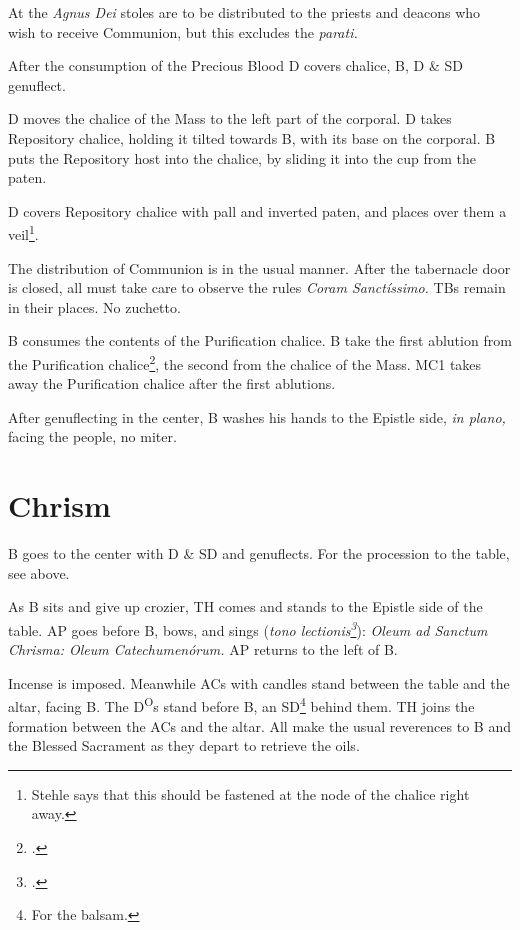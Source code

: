 \documentclass{report}
\begin{document}
\begin{multicols}{2}
    \rubric At the \textit{Agnus Dei} stoles are to be distributed to the
    priests and deacons who wish to receive Communion, but this excludes the
    \textit{parati.}

    \rubric After the consumption of the Precious Blood D covers chalice, B, D
    \& SD genuflect. 

    \rubric D moves the chalice of the Mass to the left part of the corporal. D
    takes Repository chalice, holding it tilted towards B, with its base on the
    corporal. B puts the Repository host into the chalice, by sliding it into
    the cup from the paten.

    \rubric D covers Repository chalice with pall and inverted paten, and
    places over them a veil\footnote{Stehle says that this should be fastened
    at the node of the chalice right away.}.

    \rubric The distribution of Communion is in the usual manner. After the
    tabernacle door is closed, all must take care to observe the rules
    \textit{Coram Sanctíssimo.} TBs remain in their places. No zuchetto.

    \rubric B consumes the contents of the Purification chalice. B take the
    first ablution from the Purification chalice\footcite[186]{stehle}, the
    second from the chalice of the Mass. MC1 takes away the Purification
    chalice after the first ablutions.

    \rubric After genuflecting in the center, B washes his hands to the Epistle
    side, \textit{in plano,} facing the people, no miter.

    \section{Chrism}

    \rubric B goes to the center with D \& SD and genuflects. For the
    procession to the table, see above.

    \rubric As B sits and give up crozier, TH comes and stands to the Epistle
    side of the table. AP goes before B, bows, and sings (\textit{tono
    lectionis\footcite[p. 186]{stehle}}): \textit{Oleum ad Sanctum Chrisma:
    Oleum Catechumenórum.} AP returns to the left of B.

    \rubric Incense is imposed. Meanwhile ACs with candles stand between the
    table and the altar, facing B. The D\textsuperscript{O}s stand before B, an
    SD\footnote{For the balsam.} behind them. TH joins the formation between
    the ACs and the altar. All make the usual reverences to B and the Blessed
    Sacrament as they depart to retrieve the oils.


\end{multicols}
\end{document}
